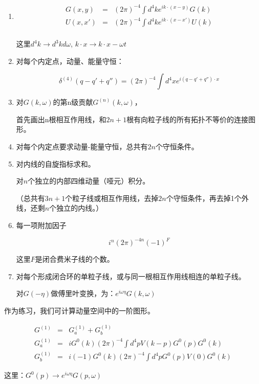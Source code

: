 \begin{enumerate}

\item 

\begin{eqnarray*}
G(x,y) & = & (2 \pi)^{-4} \int d^4 k  e^{i k \cdot (x-y)} G(k) \\
U(x, x') & = & (2 \pi)^{-4} \int d^4 k e^{i k \cdot (x-x')} U(k) \\
\end{eqnarray*}

这里$d^4 k \to d^3 k d \omega$, $k \cdot x \to k \cdot x - \omega t $

\item

对每个内定点，动量、能量守恒：

\begin{equation}
\delta^{(4)} (q - q' + q'') = (2 \pi)^{-4} \int d^4 x e^{i (q- q' + q'') \cdot x}
\end{equation}

\item

对$G(k,\omega)$的第n级贡献$G^{(n)} (k, \omega)$，

首先画出n根相互作用线，和$2n + 1$根有向粒子线的所有拓扑不等价的连接图形。

\item

对每个内定点要求动量-能量守恒，总共有$2n$个守恒条件。

\item 

对内线的自旋指标求和。

对$n$个独立的内部四维动量（哑元）积分。

（总共有$3n + 1$个粒子线或相互作用线，去掉$2n$个守恒条件，再去掉1个外线，还剩$n$个独立的内线。）

\item

每一项附加因子

\begin{equation*}
i^n (2 \pi)^{-4n} (-1)^F
\end{equation*}

这里$F$是闭合费米子线的个数。

\item

对每个形成闭合环的单粒子线，或与同一根相互作用线相连的单粒子线。

对$G(- \eta)$做傅里叶变换，为：$e^{i \omega \eta} G(k, \omega)$

\end{enumerate}

作为练习，我们可计算动量空间中的一阶图形。

\begin{eqnarray*}
G^{(1)} & = & G^{(1)}_a + G^{(1)}_b \\
G^{(1)}_a & = & i G^0 (k) (2 \pi)^{-4} \int d^4 p V(k-p) G^0 (p) G^0 (k)  \\
G^{(1)}_b & = & i (-1) G^0 (k) (2 \pi)^{-4} \int d^4 p G^0 (p) V(0) G^0 (k)
\end{eqnarray*}

这里：$G^0 (p) \to e^{i \omega \eta}  G(p, \omega)  $


